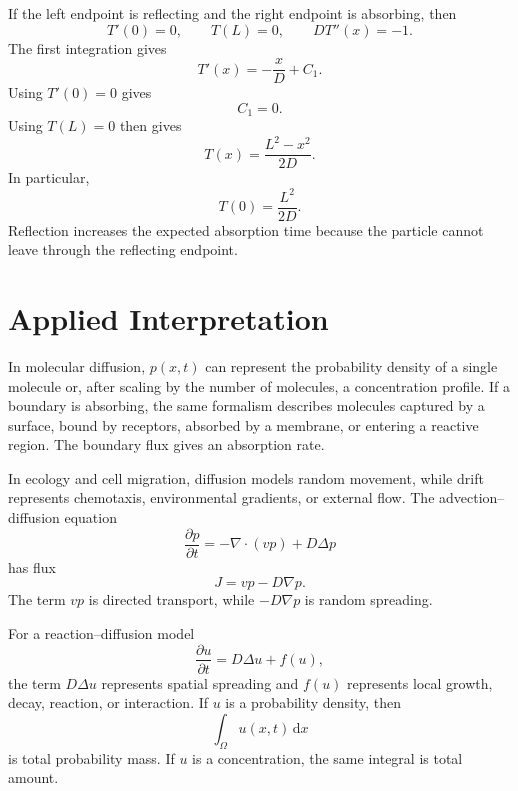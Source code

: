 \documentclass[11pt,a4paper]{article}
\numberwithin{equation}{section}
\newcommand{\dd}{\,\mathrm{d}}
\begin{document}
If the left endpoint is reflecting and the right endpoint is absorbing, then
\begin{equation}
  T'(0)=0,
  \qquad
  T(L)=0,
  \qquad
  DT''(x)=-1.
  \label{eq:reflect-absorb-bvp}
\end{equation}
The first integration gives
\begin{equation}
  T'(x)=-\frac{x}{D}+C_1.
  \label{eq:reflect-absorb-step1}
\end{equation}
Using \(T'(0)=0\) gives
\begin{equation}
  C_1=0.
  \label{eq:reflect-absorb-c1}
\end{equation}
Using \(T(L)=0\) then gives
\begin{equation}
  T(x)=\frac{L^2-x^2}{2D}.
  \label{eq:reflect-absorb-solution}
\end{equation}
In particular,
\begin{equation}
  T(0)=\frac{L^2}{2D}.
  \label{eq:reflect-absorb-origin}
\end{equation}
Reflection increases the expected absorption time because the particle cannot leave through the reflecting endpoint.

\section{Applied Interpretation}

In molecular diffusion, \(p(x,t)\) can represent the probability density of a single molecule or, after scaling by the number of molecules, a concentration profile. If a boundary is absorbing, the same formalism describes molecules captured by a surface, bound by receptors, absorbed by a membrane, or entering a reactive region. The boundary flux gives an absorption rate.

In ecology and cell migration, diffusion models random movement, while drift represents chemotaxis, environmental gradients, or external flow. The advection--diffusion equation
\begin{equation}
  \frac{\partial p}{\partial t}
  =
  -\nabla\cdot(vp)+D\Delta p
  \label{eq:advection-diffusion-nd}
\end{equation}
has flux
\begin{equation}
  J=vp-D\nabla p.
  \label{eq:advection-diffusion-nd-flux}
\end{equation}
The term \(vp\) is directed transport, while \(-D\nabla p\) is random spreading.

For a reaction--diffusion model
\begin{equation}
  \frac{\partial u}{\partial t}=D\Delta u+f(u),
  \label{eq:reaction-diffusion}
\end{equation}
the term \(D\Delta u\) represents spatial spreading and \(f(u)\) represents local growth, decay, reaction, or interaction. If \(u\) is a probability density, then
\begin{equation}
  \int_{\Omega}u(x,t)\dd x
  \label{eq:total-u}
\end{equation}
is total probability mass. If \(u\) is a concentration, the same integral is total amount.
\end{document}
